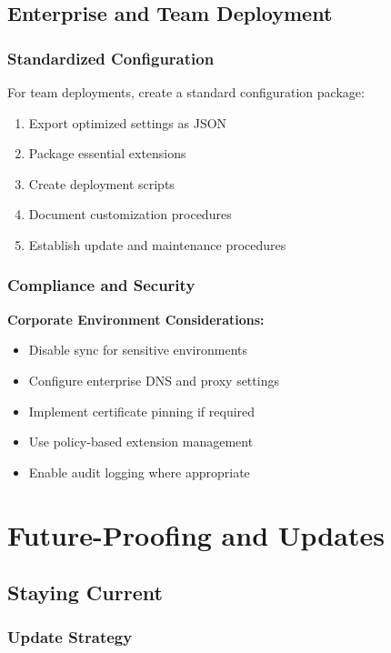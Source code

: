 \documentclass[11pt,a4paper,oneside]{book}
\begin{document}
\section{Enterprise and Team Deployment}

\subsection{Standardized Configuration}

For team deployments, create a standard configuration package:

\begin{enumerate}
    \item Export optimized settings as JSON
    \item Package essential extensions
    \item Create deployment scripts
    \item Document customization procedures
    \item Establish update and maintenance procedures
\end{enumerate}

\subsection{Compliance and Security}

\textbf{Corporate Environment Considerations:}
\begin{itemize}
    \item Disable sync for sensitive environments
    \item Configure enterprise DNS and proxy settings
    \item Implement certificate pinning if required
    \item Use policy-based extension management
    \item Enable audit logging where appropriate
\end{itemize}

\chapter{Future-Proofing and Updates}

\section{Staying Current}

\subsection{Update Strategy}
\end{document}
